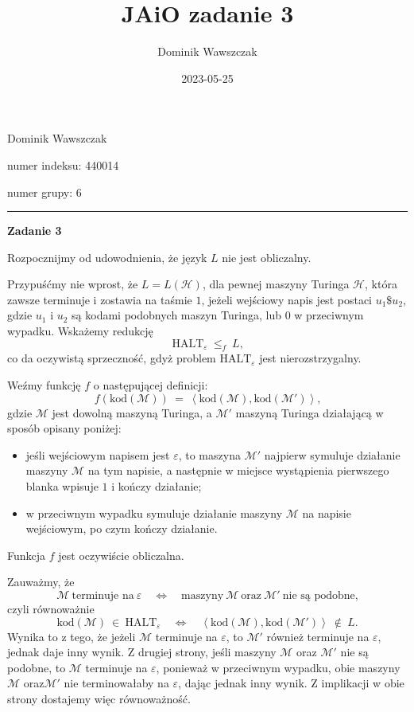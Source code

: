 \documentclass[12pt]{article}
\title{JAiO zadanie 3}
\author{Dominik Wawszczak}
\date{2023-05-25}
\begin{document}
	\setlength{\parindent}{0 cm}
	
	Dominik Wawszczak
	
	numer indeksu: 440014
	
	numer grupy: 6
	
	\bigskip
	\hrule
	\bigskip
	
	\textbf{Zadanie 3}
	
	\medskip
	
	Rozpocznijmy od udowodnienia, że język \(L\) nie jest obliczalny.
	
	\medskip
	
	Przypuśćmy nie wprost, że \(L = L \left( \mathcal{H} \right)\), dla pewnej
	maszyny Turinga \(\mathcal{H}\), która zawsze terminuje i zostawia na taśmie
	\(1\), jeżeli wejściowy napis jest postaci \(u_{1} \$ u_{2}\), gdzie
	\(u_{1}\) i \(u_{2}\) są kodami podobnych maszyn Turinga, lub \(0\) w
	przeciwnym wypadku. Wskażemy redukcję
	\[ \text{HALT}_{\varepsilon} \ \leqslant_{f} \ L \text{,} \]
	co da oczywistą sprzeczność, gdyż problem \(\text{HALT}_{\varepsilon}\) jest
	nierozstrzygalny.
	
	\medskip
	
	Weźmy funkcję \(f\) o następującej definicji:
	\[ f \left( \text{kod} \left( \mathcal{M} \right) \right) \ = \ \left\langle
	\text{kod} \left( \mathcal{M} \right), \text{kod} \left( \mathcal{M}'
	\right) \right\rangle \text{,} \]
	gdzie \(\mathcal{M}\) jest dowolną maszyną Turinga, a \(\mathcal{M}'\)
	maszyną Turinga działającą w sposób opisany poniżej:
	\begin{itemize}
		\item jeśli wejściowym napisem jest \(\varepsilon\), to maszyna
		      \(\mathcal{M}'\) najpierw symuluje działanie maszyny
		      \(\mathcal{M}\) na tym napisie, a następnie w miejsce wystąpienia
		      pierwszego blanka wpisuje \(1\) i kończy działanie;
		\item w przeciwnym wypadku symuluje działanie maszyny \(\mathcal{M}\) na
		      napisie wejściowym, po czym kończy działanie.
	\end{itemize}
	Funkcja \(f\) jest oczywiście obliczalna.
	
	\medskip
	
	Zauważmy, że
	\[ \mathcal{M} \ \text{terminuje na} \ \varepsilon \quad \iff \quad
	\text{maszyny} \ \mathcal{M} \ \text{oraz} \ \mathcal{M}' \ \text{nie są
	podobne,} \]
	czyli równoważnie
	\[ \text{kod} \left( \mathcal{M} \right) \ \in \ \text{HALT}_{\varepsilon}
	\quad \iff \quad \left\langle \text{kod} \left( \mathcal{M} \right),
	\text{kod} \left( \mathcal{M}' \right) \right\rangle \ \notin \ L
	\text{.} \]
	Wynika to z tego, że jeżeli \(\mathcal{M}\) terminuje na \(\varepsilon\),
	to \(\mathcal{M}'\) również terminuje na \(\varepsilon\), jednak daje inny
	wynik. Z drugiej strony, jeśli maszyny \(\mathcal{M}\) oraz \(\mathcal{M}'\)
	nie są podobne, to \(\mathcal{M}\) terminuje na \(\varepsilon\), ponieważ w
	przeciwnym wypadku, obie maszyny \(\mathcal{M}\) oraz\(\mathcal{M}'\) nie
	terminowałaby na \(\varepsilon\), dając jednak inny wynik. Z implikacji w
	obie strony dostajemy więc równoważność.
	
\end{document}
